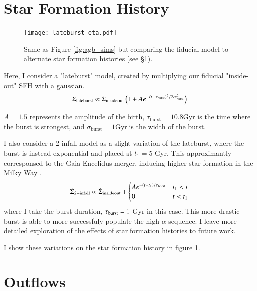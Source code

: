 \documentclass[12pt,oneside]{report}
\begin{document}
\section{Star Formation History} \label{sec:sfh}



\begin{figure}
\centering
\texttt{[image: lateburst\_eta.pdf]}

\caption[Lateburst models]{Same as Figure \ref{fig:agb_sims} but comparing the fiducial model to alternate star formation histories (see \S \ref{sec:sfh}).}
\label{fig:sfh_models}

\end{figure}


Here, I consider a "lateburst" model, created by multiplying our fiducial "inside-out" SFH with a gaussian.
\begin{equation}\label{eq:lateburst}
    \dot{\Sigma}_{\rm lateburst} \propto \dot{\Sigma}_{\rm insideout} \left(1 + A e^{-(t-\tau_{\rm burst})^2/2\sigma^2_{\rm burst}} \right)
\end{equation}

$A=1.5$ represents the amplitude of the birth, $\tau_\text{burst}=10.8$Gyr is the time where the burst is strongest, and $\sigma_\text{burst}=1$Gyr is the width of the burst.

I also consider a 2-infall model as a slight variation of the lateburst, where the burst is instead exponential and placed at $t_1=5$ Gyr. This approximantly corresponsed to the Gaia-Encelidus merger, inducing higher star formation in the Milky Way \citep{bonaca20, helmi18}.
\begin{equation}\label{eq:twoinfall}
    \dot{\Sigma}_{\rm 2-infall} \propto \dot{\Sigma}_{\rm insideout} + 
\begin{cases}
    Ae^{-(t-t_1)/\tau_{\rm burst}} & t_1 < t \\
      0 & t<t_1
\end{cases}
\end{equation}
where I take the burst duration, $\tau_{\rm burst}=1$ Gyr in this case. 
This more drastic burst is able to more successfuly populate the high-$\alpha$ sequence. I leave more detailed exploration of the effects of star formation histories to future work.

I show these variations on the star formation history in figure \ref{fig:sfh_models}.


\section{Outflows} \label{sec:outflows}
\end{document}
